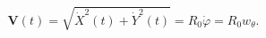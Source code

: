 \begin{equation}
\mathbf{V}\left(  t\right)  =\sqrt{\dot{X}^{2}(t)+\dot{Y}^{2}(t)}=R_{0}%
\dot{\varphi}=R_{0}w_{\theta}.\label{44}%
\end{equation}

